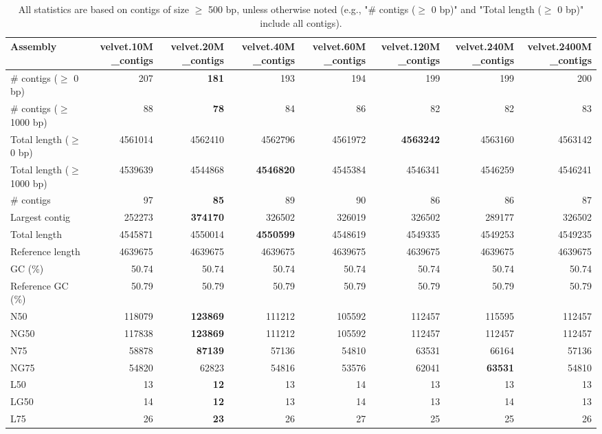 \documentclass[12pt,a4paper]{article}
\begin{document}
\begin{table}[ht]
\begin{center}
\caption{All statistics are based on contigs of size $\geq$ 500 bp, unless otherwise noted (e.g., "\# contigs ($\geq$ 0 bp)" and "Total length ($\geq$ 0 bp)" include all contigs).}
\begin{tabular}{|l*{7}{|r}|}
\hline
Assembly & velvet.10M\_contigs & velvet.20M\_contigs & velvet.40M\_contigs & velvet.60M\_contigs & velvet.120M\_contigs & velvet.240M\_contigs & velvet.2400M\_contigs \\ \hline
\# contigs ($\geq$ 0 bp) & 207 & {\bf 181} & 193 & 194 & 199 & 199 & 200 \\ \hline
\# contigs ($\geq$ 1000 bp) & 88 & {\bf 78} & 84 & 86 & 82 & 82 & 83 \\ \hline
Total length ($\geq$ 0 bp) & 4561014 & 4562410 & 4562796 & 4561972 & {\bf 4563242} & 4563160 & 4563142 \\ \hline
Total length ($\geq$ 1000 bp) & 4539639 & 4544868 & {\bf 4546820} & 4545384 & 4546341 & 4546259 & 4546241 \\ \hline
\# contigs & 97 & {\bf 85} & 89 & 90 & 86 & 86 & 87 \\ \hline
Largest contig & 252273 & {\bf 374170} & 326502 & 326019 & 326502 & 289177 & 326502 \\ \hline
Total length & 4545871 & 4550014 & {\bf 4550599} & 4548619 & 4549335 & 4549253 & 4549235 \\ \hline
Reference length & 4639675 & 4639675 & 4639675 & 4639675 & 4639675 & 4639675 & 4639675 \\ \hline
GC (\%) & 50.74 & 50.74 & 50.74 & 50.74 & 50.74 & 50.74 & 50.74 \\ \hline
Reference GC (\%) & 50.79 & 50.79 & 50.79 & 50.79 & 50.79 & 50.79 & 50.79 \\ \hline
N50 & 118079 & {\bf 123869} & 111212 & 105592 & 112457 & 115595 & 112457 \\ \hline
NG50 & 117838 & {\bf 123869} & 111212 & 105592 & 112457 & 112457 & 112457 \\ \hline
N75 & 58878 & {\bf 87139} & 57136 & 54810 & 63531 & 66164 & 57136 \\ \hline
NG75 & 54820 & 62823 & 54816 & 53576 & 62041 & {\bf 63531} & 54810 \\ \hline
L50 & 13 & {\bf 12} & 13 & 14 & 13 & 13 & 13 \\ \hline
LG50 & 14 & {\bf 12} & 13 & 14 & 13 & 14 & 13 \\ \hline
L75 & 26 & {\bf 23} & 26 & 27 & 25 & 25 & 26 \\ \hline

\end{tabular}
\end{center}
\end{table}
\end{document}
